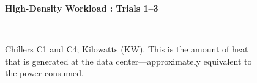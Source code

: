 \documentclass{report}
\begin{document}
\begin{figure}[!h]
\centerline{\bfseries\large High-Density Workload : Trials 1--3}\\
\caption{Chillers C1 and C4; Kilowatts (KW). This is the amount of heat that is generated at the data center---approximately equivalent to the power consumed.}
\end{figure}
\end{document}
